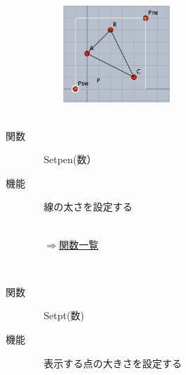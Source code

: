 \documentclass[papersize,a4paper,12pt,uplatex]{jsarticle}
\begin{document}
\begin{description}
　　　\includegraphics[bb=0 0 227 205 , width=4cm]{Fig/setorigin.png}　　\\
　\\
\hypertarget{setpen}{}
\item[関数]　Setpen(数）  　　
\item[機能]　線の太さを設定する\\
　\\[-5mm]
\begin{flushright}　\hyperlink{functionlist}{$\Rightarrow$関数一覧}\end{flushright}
　\\
\hypertarget{setpt}{}
\item[関数]　Setpt(数)    　　　
\item[機能]　表示する点の大きさを設定する\\


\end{description}
\end{document}

